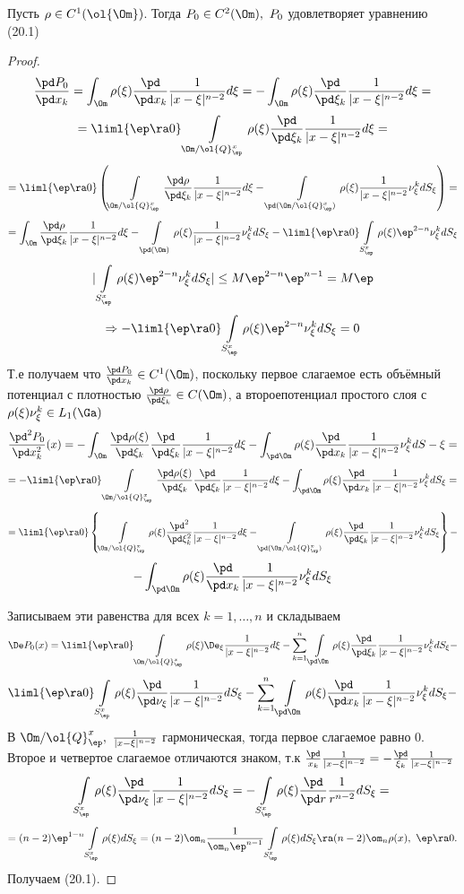 \documentclass[a4paper,draft]{article}
\begin{document}
\begin{theorem}[1]
Пусть $\rho\in C^1(\ol{\Om})$. Тогда $P_0\in C^2(\Om),\ P_0$ удовлетворяет уравнению (20.1)
\end{theorem}
\begin{proof}
$$
\frac{\pd P_0}{\pd x_k}=
\int_\Om\rho(\xi)\frac{\pd}{\pd x_k}\frac{1}{|x-\xi|^{n-2}}d\xi=
-\int_\Om\rho(\xi)\frac{\pd}{\pd \xi_k}\frac{1}{|x-\xi|^{n-2}}d\xi=
$$
$$
=\liml{\ep\ra 0}
\int\limits_{\Om/\ol{Q}_\ep^x}
\rho(\xi)\frac{\pd}{\pd \xi_k}\frac{1}{|x-\xi|^{n-2}}d\xi=
$$
$$
=
\liml{\ep\ra 0}
\left(
\int\limits_{\Om/\ol{Q}_\ep^x}
\frac{\pd\rho}{\pd \xi_k}\frac{1}{|x-\xi|^{n-2}}d\xi
-
\int\limits_{\pd(\Om/\ol{Q}_\ep^x)}
\rho(\xi)\frac{1}{|x-\xi|^{n-2}}\nu_\xi^k dS_\xi
\right)=
$$
$$
=
\int_\Om\frac{\pd\rho}{\pd \xi_k}\frac{1}{|x-\xi|^{n-2}}d\xi
-\int\limits_{\pd(\Om)}
\rho(\xi)\frac{1}{|x-\xi|^{n-2}}\nu_\xi^k dS_\xi
-\liml{\ep\ra 0}
\int\limits_{S_\ep^x}\rho(\xi)\ep^{2-n}\nu_\xi^k dS_\xi
$$
$$
|\int\limits_{S_\ep^x}\rho(\xi)\ep^{2-n}\nu_\xi^k dS_\xi|\le
M\ep^{2-n}\ep^{n-1}=M\ep
$$
$$
\Rightarrow -\liml{\ep\ra 0}
\int\limits_{S_\ep^x}\rho(\xi)\ep^{2-n}\nu_\xi^k dS_\xi=0
$$
Т.е получаем что $\frac{\pd P_0}{\pd x_k}\in C^1(\Om)$, поскольку первое слагаемое есть
объёмный потенциал с плотностью
$\frac{\pd \rho}{\pd \xi_k}\in C(\Om)$,
а второе\т потенциал простого слоя с $\rho(\xi)\nu_\xi^k\in L_1(\Ga)$
$$
\frac{\pd^2 P_0}{\pd x_k^2}(x)=
-\int_\Om
\frac{\pd \rho(\xi)}{\pd \xi_k}\frac{\pd}{\pd \xi_k}\frac{1}{|x-\xi|^{n-2}}d\xi
-\int_{\pd\Om}
\rho(\xi)\frac{\pd}{\pd x_k}\frac{1}{|x-\xi|^{n-2}}\nu_\xi^k dS-\xi=
$$
$$
=
-\liml{\ep\ra 0}
\int\limits_{\Om/\ol{Q}_\ep^x}
\frac{\pd\rho(\xi)}{\pd\xi_k}\frac{\pd}{\pd \xi_k}\frac{1}{|x-\xi|^{n-2}}d\xi
-\int_{\pd\Om}
\rho(\xi)\frac{\pd}{\pd x_k}\frac{1}{|x-\xi|^{n-2}}\nu_\xi^k dS_\xi=
$$
$$
=
\liml{\ep\ra 0}
\left\{
\int\limits_{\Om/\ol{Q}_\ep^x}
\rho(\xi)\frac{\pd^2}{\pd \xi_k^2}\frac{1}{|x-\xi|^{n-2}}d\xi
-
\int\limits_{\pd(\Om/\ol{Q}_\ep^x)}
\rho(\xi)\frac{\pd}{\pd \xi_k}\frac{1}{|x-\xi|^{n-2}}\nu_\xi^kdS_\xi
\right\}-
$$
$$
-\int_{\pd\Om}
\rho(\xi)\frac{\pd}{\pd x_k}\frac{1}{|x-\xi|^{n-2}}\nu_\xi^k dS_\xi
$$

Записываем эти равенства для всех $k=1,\dots,n$ и складываем
$$
\De P_0(x)=
\liml{\ep\ra 0}
\int\limits_{\Om/\ol{Q}_\ep^x}
\rho(\xi)\De_\xi\frac{1}{|x-\xi|^{n-2}}d\xi-
\sum\limits_{k=1}^n
\int\limits_{\pd\Om}
\rho(\xi)\frac{\pd}{\pd \xi_k}\frac{1}{|x-\xi|^{n-2}}\nu_\xi^kdS_\xi-
$$
$$
\liml{\ep\ra 0}
\int\limits_{S_\ep^x}
\rho(\xi)\frac{\pd}{\pd\nu_\xi}\frac{1}{|x-\xi|^{n-2}}dS_\xi
-\sum\limits_{k=1}^n
\int\limits_{\pd\Om}
\rho(\xi)\frac{\pd}{\pd x_k}\frac{1}{|x-\xi|^{n-2}}\nu_\xi^kdS_\xi-
$$
В $\Om/\ol{Q}_\ep^x,\ \frac{1}{|x-\xi|^{n-2}}$ гармоническая, тогда
первое слагаемое равно 0.\\
Второе и четвертое слагаемое отличаются знаком, т.к
$\frac{\pd}{x_k}\frac{1}{|x-\xi|^{n-2}}=-\frac{\pd}{\xi_k}\frac{1}{|x-\xi|^{n-2}}$
$$
\int\limits_{S_\ep^x}
\rho(\xi)\frac{\pd}{\pd\nu_\xi}\frac{1}{|x-\xi|^{n-2}}dS_\xi=
-\int\limits_{S_\ep^x}
\rho(\xi)\frac{\pd}{\pd r}\frac{1}{r^{n-2}}dS_\xi=
$$
$$
=(n-2)\ep^{1-n}
\int\limits_{S_\ep^x} \rho(\xi)dS_\xi=
(n-2)\om_n\frac{1}{\om_n\ep^{n-1}}
\int\limits_{S_\ep^x} \rho(\xi)dS_\xi
\ra(n-2)\om_n\rho(x),\ \ep\ra 0.
$$
Получаем (20.1).


\end{proof}
\end{document}
